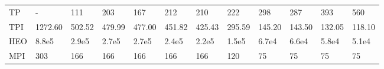 \begin{table*}
{\begin{tabular}{llllllllllll}
TP       &                - &               111 &               203 &               167 &               212 &              210 &              222 &              298 &              287 &              393 &              560 \\
TPI      &          1272.60 &            502.52 &            479.99 &            477.00 &            451.82 &           425.43 &           295.59 &           145.20 &           143.50 &           132.05 &           118.10 \\
HEO      &            8.8e5 &             2.9e5 &             2.7e5 &             2.7e5 &             2.4e5 &            2.2e5 &            1.5e5 &            6.7e4 &            6.6e4 &            5.8e4 &            5.1e4 \\
MPI      &              303 &               166 &               166 &               166 &               166 &              166 &              120 &               75 &               75 &               75 &               75 \\
\bottomrule
\end{tabular}}
\end{table*}
